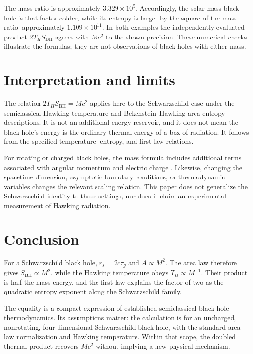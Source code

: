 \documentclass[12pt]{article}
\begin{document}
The mass ratio is approximately $3.329\times10^5$. Accordingly, the solar-mass black hole is that factor colder, while its entropy is larger by the square of the mass ratio, approximately $1.109\times10^{11}$. In both examples the independently evaluated product $2T_HS_{\mathrm{BH}}$ agrees with $Mc^2$ to the shown precision. These numerical checks illustrate the formulas; they are not observations of black holes with either mass.

\section{Interpretation and limits}

The relation $2T_HS_{\mathrm{BH}}=Mc^2$ applies here to the Schwarzschild case under the semiclassical Hawking-temperature and Bekenstein--Hawking area-entropy descriptions. It is not an additional energy reservoir, and it does not mean the black hole's energy is the ordinary thermal energy of a box of radiation. It follows from the specified temperature, entropy, and first-law relations.

For rotating or charged black holes, the mass formula includes additional terms associated with angular momentum and electric charge \cite{BardeenCarterHawking,Smarr}. Likewise, changing the spacetime dimension, asymptotic boundary conditions, or thermodynamic variables changes the relevant scaling relation. This paper does not generalize the Schwarzschild identity to those settings, nor does it claim an experimental measurement of Hawking radiation.

\section{Conclusion}

For a Schwarzschild black hole, $r_s=2c\tau_g$ and $A\propto M^2$. The area law therefore gives $S_{\mathrm{BH}}\propto M^2$, while the Hawking temperature obeys $T_H\propto M^{-1}$. Their product is half the mass-energy, and the first law explains the factor of two as the quadratic entropy exponent along the Schwarzschild family.

The equality is a compact expression of established semiclassical black-hole thermodynamics. Its assumptions matter: the calculation is for an uncharged, nonrotating, four-dimensional Schwarzschild black hole, with the standard area-law normalization and Hawking temperature. Within that scope, the doubled thermal product recovers $Mc^2$ without implying a new physical mechanism.
\end{document}
